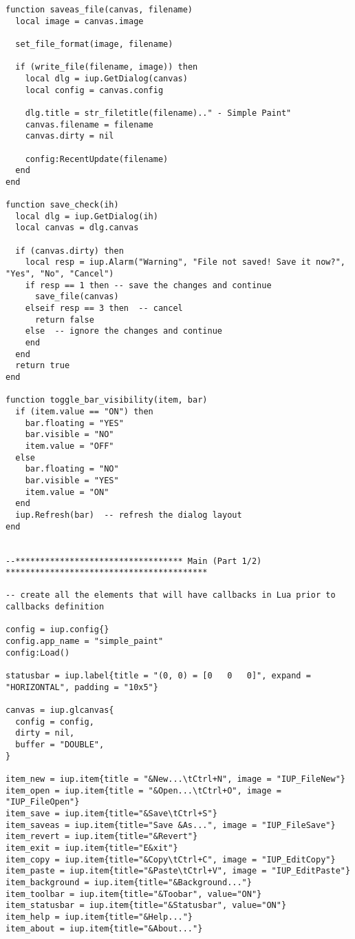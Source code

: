 \documentclass{ctexart}
\begin{document}
\begin{lstlisting}
function saveas_file(canvas, filename)
  local image = canvas.image

  set_file_format(image, filename)

  if (write_file(filename, image)) then
    local dlg = iup.GetDialog(canvas)
    local config = canvas.config
    
    dlg.title = str_filetitle(filename).." - Simple Paint"
    canvas.filename = filename
    canvas.dirty = nil
    
    config:RecentUpdate(filename)
  end
end

function save_check(ih)
  local dlg = iup.GetDialog(ih)
  local canvas = dlg.canvas
  
  if (canvas.dirty) then
    local resp = iup.Alarm("Warning", "File not saved! Save it now?", "Yes", "No", "Cancel")
    if resp == 1 then -- save the changes and continue
      save_file(canvas)
    elseif resp == 3 then  -- cancel
      return false
    else  -- ignore the changes and continue
    end
  end
  return true
end

function toggle_bar_visibility(item, bar)
  if (item.value == "ON") then
    bar.floating = "YES"
    bar.visible = "NO"
    item.value = "OFF"
  else
    bar.floating = "NO"
    bar.visible = "YES"
    item.value = "ON"
  end
  iup.Refresh(bar)  -- refresh the dialog layout
end


--********************************** Main (Part 1/2) *****************************************

-- create all the elements that will have callbacks in Lua prior to callbacks definition

config = iup.config{}
config.app_name = "simple_paint"
config:Load()

statusbar = iup.label{title = "(0, 0) = [0   0   0]", expand = "HORIZONTAL", padding = "10x5"}

canvas = iup.glcanvas{
  config = config,
  dirty = nil,
  buffer = "DOUBLE",
}

item_new = iup.item{title = "&New...\tCtrl+N", image = "IUP_FileNew"}
item_open = iup.item{title = "&Open...\tCtrl+O", image = "IUP_FileOpen"}
item_save = iup.item{title="&Save\tCtrl+S"}
item_saveas = iup.item{title="Save &As...", image = "IUP_FileSave"}
item_revert = iup.item{title="&Revert"}
item_exit = iup.item{title="E&xit"}
item_copy = iup.item{title="&Copy\tCtrl+C", image = "IUP_EditCopy"}
item_paste = iup.item{title="&Paste\tCtrl+V", image = "IUP_EditPaste"}
item_background = iup.item{title="&Background..."}
item_toolbar = iup.item{title="&Toobar", value="ON"}
item_statusbar = iup.item{title="&Statusbar", value="ON"}
item_help = iup.item{title="&Help..."}
item_about = iup.item{title="&About..."}


\end{lstlisting}
\end{document}

